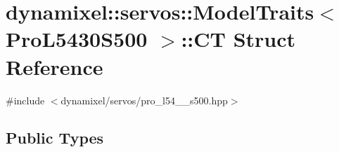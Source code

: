 \hypertarget{structdynamixel_1_1servos_1_1_model_traits_3_01_pro_l5430_s500_01_4_1_1_c_t}{}\section{dynamixel\+:\+:servos\+:\+:Model\+Traits$<$ Pro\+L5430\+S500 $>$\+:\+:CT Struct Reference}
\label{structdynamixel_1_1servos_1_1_model_traits_3_01_pro_l5430_s500_01_4_1_1_c_t}


{\ttfamily \#include $<$dynamixel/servos/pro\+\_\+l54\+\_\+\_\+s500.\+hpp$>$}

\subsection*{Public Types}
